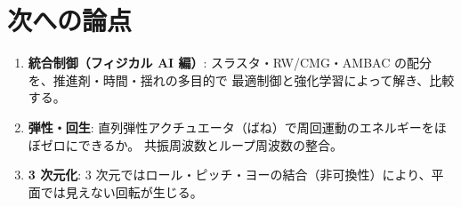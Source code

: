\section{次への論点}

\begin{enumerate}
\def\labelenumi{\arabic{enumi}.}
\tightlist
\item
  \textbf{統合制御（フィジカル AI 編）}: スラスタ・RW/CMG・AMBAC の配分を、推進剤・時間・揺れの多目的で 最適制御と強化学習によって解き、比較する。
\item
  \textbf{弾性・回生}: 直列弾性アクチュエータ（ばね）で周回運動のエネルギーをほぼゼロにできるか。 共振周波数とループ周波数の整合。
\item
  \textbf{3 次元化}: 3 次元ではロール・ピッチ・ヨーの結合（非可換性）により、平面では見えない回転が生じる。
\end{enumerate}
